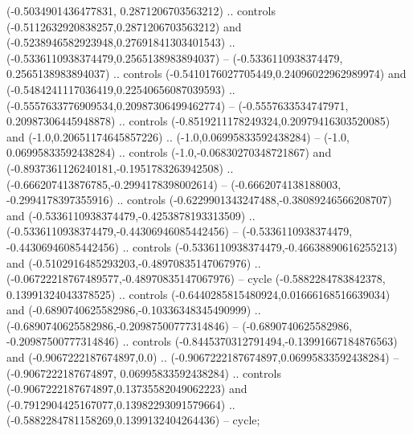 (-0.5034901436477831, 0.2871206703563212) .. controls (-0.5112632920838257,0.2871206703563212) and (-0.5238946582923948,0.27691841303401543) .. (-0.5336110938374479,0.2565138983894037) --
(-0.5336110938374479, 0.2565138983894037) .. controls (-0.5410176027705449,0.24096022962989974) and (-0.5484241117036419,0.22540656087039593) .. (-0.5557633776909534,0.20987306499462774) --
(-0.5557633534747971, 0.20987306445948878) .. controls (-0.8519211178249324,0.20979416303520085) and (-1.0,0.20651174645857226) .. (-1.0,0.06995833592438284) --
(-1.0, 0.06995833592438284) .. controls (-1.0,-0.06830270348721867) and (-0.8937361126240181,-0.1951783263942508) .. (-0.666207413876785,-0.2994178398002614) --
(-0.6662074138188003, -0.2994178397355916) .. controls (-0.6229901343247488,-0.38089246566208707) and (-0.5336110938374479,-0.4253878193313509) .. (-0.5336110938374479,-0.44306946085442456) --
(-0.5336110938374479, -0.44306946085442456) .. controls (-0.5336110938374479,-0.46638890616255213) and (-0.5102916485293203,-0.48970835147067976) .. (-0.06722218767489577,-0.48970835147067976) --
cycle
	(-0.5882284783842378, 0.13991324043378525) .. controls (-0.6440285815480924,0.01666168516639034) and (-0.6890740625582986,-0.10336348345490999) .. (-0.6890740625582986,-0.20987500777314846) --
(-0.6890740625582986, -0.20987500777314846) .. controls (-0.8445370312791494,-0.13991667184876563) and (-0.9067222187674897,0.0) .. (-0.9067222187674897,0.06995833592438284) --
(-0.9067222187674897, 0.06995833592438284) .. controls (-0.9067222187674897,0.13735582049062223) and (-0.7912904425167077,0.13982293091579664) .. (-0.5882284781158269,0.1399132404264436) --
cycle;